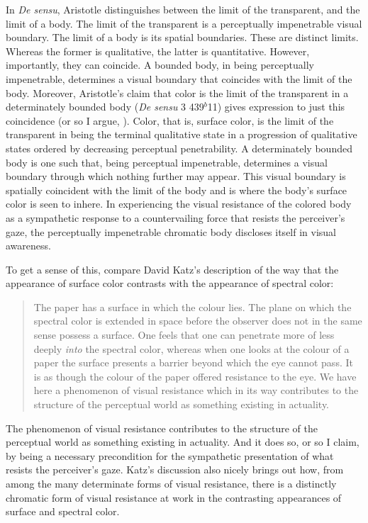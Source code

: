 In \emph{De sensu}, Aristotle distinguishes between the limit of the transparent, and the limit of a body. The limit of the transparent is a perceptually impenetrable visual boundary. The limit of a body is its spatial boundaries. These are distinct limits. Whereas the former is qualitative, the latter is quantitative. However, importantly, they can coincide. A bounded body, in being perceptually impenetrable, determines a visual boundary that coincides with the limit of the body. Moreover, Aristotle’s claim that color is the limit of the transparent in a determinately bounded body (\emph{De sensu} 3 439\( ^{b} \)11) gives expression to just this coincidence (or so I argue, \citealt[chapter 3.3]{Kalderon:2015fr}). Color, that is, surface color, is the limit of the transparent in being the terminal qualitative state in a progression of qualitative states ordered by decreasing perceptual penetrability. A determinately bounded body is one such that, being perceptual impenetrable, determines a visual boundary through which nothing further may appear. This visual boundary is spatially coincident with the limit of the body and is where the body’s surface color is seen to inhere. In experiencing the visual resistance of the colored body as a sympathetic response to a countervailing force that resists the perceiver's gaze, the perceptually impenetrable chromatic body discloses itself in visual awareness.

To get a sense of this, compare David Katz's description of the way that the appearance of surface color contrasts with the appearance of spectral color:
\begin{quote}
	The paper has a surface in which the colour lies. The plane on which the spectral color is extended in space before the observer does not in the same sense possess a surface. One feels that one can penetrate more of less deeply \emph{into} the spectral color, whereas when one looks at the colour of a paper the surface presents a barrier beyond which the eye cannot pass. It is as though the colour of the paper offered resistance to the eye. We have here a phenomenon of visual resistance which in its way contributes to the structure of the perceptual world as something existing in actuality. \citep[8]{Katz:1935qv}
\end{quote}
The phenomenon of visual resistance contributes to the structure of the perceptual world as something existing in actuality. And it does so, or so I claim, by being a necessary precondition for the sympathetic presentation of what resists the perceiver's gaze. Katz's discussion also nicely brings out how, from among the many determinate forms of visual resistance, there is a distinctly chromatic form of visual resistance at work in the contrasting appearances of surface and spectral color.

